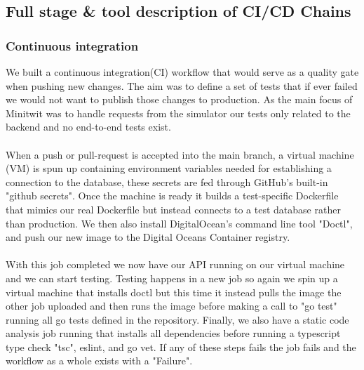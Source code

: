 \subsection{Full stage \& tool description of CI/CD Chains}


\subsubsection{Continuous integration}\label{subsubsec:ci}
We built a continuous integration(CI) workflow\cite{DevOps-CI-CDont} that would serve as a quality gate when pushing new changes. The aim was to define a set of tests that if ever failed we would not want to publish those changes to production. As the main focus of Minitwit was to handle requests from the simulator our tests only related to the backend and no end-to-end tests exist.\\\\
When a push or pull-request is accepted into the main branch, a virtual machine (VM) is spun up containing environment variables needed for establishing a connection to the database, these secrets are fed through GitHub's built-in "github secrets"\cite{GitHub-Secrets}. Once the machine is ready it builds a test-specific Dockerfile that mimics our real Dockerfile but instead connects to a test database rather than production. We then also install DigitalOcean's command line tool "Doctl"\cite{DigitalOcean-doctl}, and push our new image to the Digital Oceans Container registry.\\\\
With this job completed we now have our API running on our virtual machine and we can start testing. Testing happens in a new job so again we spin up a virtual machine that installs doctl but this time it instead pulls the image the other job uploaded and then runs the image before making a call to "go test" running all go tests defined in the repository. Finally, we also have a static code analysis job running that installs all dependencies before running a typescript type check "tsc", eslint, and go vet. If any of these steps fails the job fails and the workflow as a whole exists with a "Failure". 

